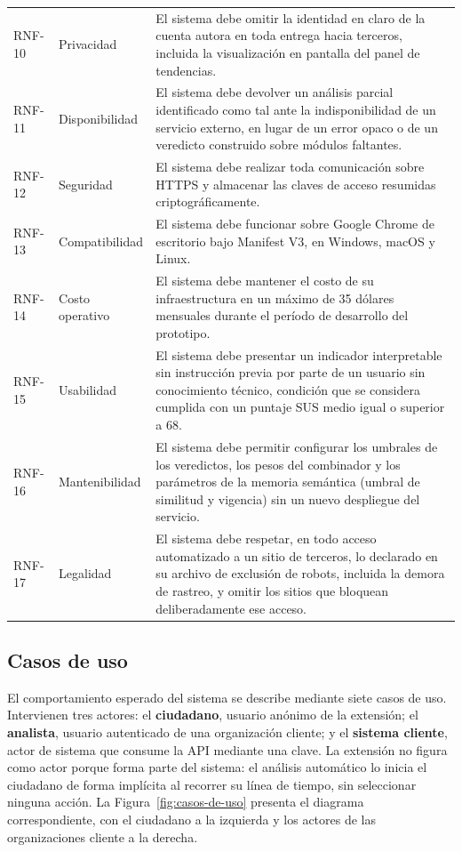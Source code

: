\begin{small}
\begin{longtable}{@{}p{1.5cm} p{2.6cm} p{9.6cm}@{}}
  RNF-10 & Privacidad & El sistema debe omitir la identidad en claro de la cuenta autora en toda entrega hacia terceros, incluida la visualización en pantalla del panel de tendencias. \\
  RNF-11 & Disponibilidad & El sistema debe devolver un análisis parcial identificado como tal ante la indisponibilidad de un servicio externo, en lugar de un error opaco o de un veredicto construido sobre módulos faltantes. \\
  RNF-12 & Seguridad & El sistema debe realizar toda comunicación sobre HTTPS y almacenar las claves de acceso resumidas criptográficamente. \\
  RNF-13 & Compatibilidad & El sistema debe funcionar sobre Google Chrome de escritorio bajo Manifest V3, en Windows, macOS y Linux. \\
  RNF-14 & Costo operativo & El sistema debe mantener el costo de su infraestructura en un máximo de 35 dólares mensuales durante el período de desarrollo del prototipo. \\
  RNF-15 & Usabilidad & El sistema debe presentar un indicador interpretable sin instrucción previa por parte de un usuario sin conocimiento técnico, condición que se considera cumplida con un puntaje SUS medio igual o superior a 68. \\
  RNF-16 & Mantenibilidad & El sistema debe permitir configurar los umbrales de los veredictos, los pesos del combinador y los parámetros de la memoria semántica (umbral de similitud y vigencia) sin un nuevo despliegue del servicio. \\
  RNF-17 & Legalidad & El sistema debe respetar, en todo acceso automatizado a un sitio de terceros, lo declarado en su archivo de exclusión de robots, incluida la demora de rastreo, y omitir los sitios que bloquean deliberadamente ese acceso. \\
\end{longtable}
\end{small}

\subsection{Casos de uso}
\label{sec:casos-uso}

El comportamiento esperado del sistema se describe mediante siete casos de uso. Intervienen tres actores: el \textbf{ciudadano}, usuario anónimo de la extensión; el \textbf{analista}, usuario autenticado de una organización cliente; y el \textbf{sistema cliente}, actor de sistema que consume la API mediante una clave. La extensión no figura como actor porque forma parte del sistema: el análisis automático lo inicia el ciudadano de forma implícita al recorrer su línea de tiempo, sin seleccionar ninguna acción. La Figura~\ref{fig:casos-de-uso} presenta el diagrama correspondiente, con el ciudadano a la izquierda y los actores de las organizaciones cliente a la derecha.

